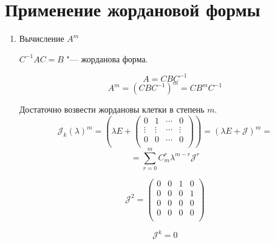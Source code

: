 \section{Применение жордановой формы}
\begin{enumerate}
\item Вычисление $A^{m}$

$C^{-1}AC = B$ "--- жорданова форма.

$$A = CBC^{-1}$$
$$A^{m} = (CBC^{-1})^m = CB^{m}C^{-1}$$

Достаточно возвести жордановы клетки в степень $m$.
$$\mathcal{J}_k(\lambda)^m = (\lambda E + 
\begin{pmatrix}
0&1&\cdots&0\\
\vdots&\vdots&\cdots&\vdots\\
0&0&\cdots&0\\
\end{pmatrix}) = (\lambda E + \mathcal{J})^m = $$
$$= \sum_{r = 0}^{m}C_m^{r}\lambda^{m - r}\mathcal{J}^r$$

$$ 
\mathcal{J}^2 = \begin{pmatrix}
0&0&1&0\\
0&0&0&1\\
0&0&0&0\\
0&0&0&0\\
\end{pmatrix}
$$

$$\mathcal{J}^k = 0$$


\end{enumerate}
